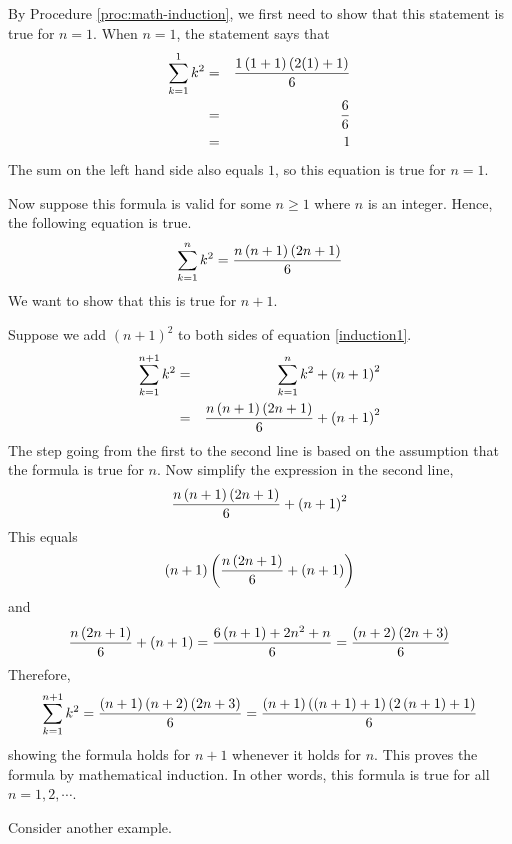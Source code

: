 \begin{solution}
By Procedure \ref{proc:math-induction}, we first need to show that this statement is true for $n=1$.
When $n=1$, the statement says that 
\begin{eqnarray*}
\sum_{k=1}^{1}k^{2}&=&\frac{1\left(1+1\right) \left(2(1)+1\right) }{6}\\
&=&\frac{6}{6} \\
&=& 1
\end{eqnarray*}
The sum on the left hand side also equals $1$, so this equation is true for $n=1$.

Now suppose this formula is valid for some $n\geq
1$ where $n$ is an integer. Hence, the following equation is true.
\begin{equation}
\sum_{k=1}^{n}k^{2}=
\frac{n\left(n+1\right) \left(2n+1\right) }{6}
\label{induction1}
\end{equation}
We want to show that this is true for $n+1$. 

Suppose we add $(n+1)^2$ to both sides of equation \ref{induction1}.
\begin{eqnarray*}
\sum_{k=1}^{n+1}k^{2}&=&\sum_{k=1}^{n}k^{2}+\left(n+1\right) ^{2} \\
&=&\frac{n\left(n+1\right) \left(2n+1\right) }{6}+\left(n+1\right) ^{2}
\end{eqnarray*}
The step going from the first to the second line is based on the assumption
that the formula is true for $n.$
Now simplify the expression in the second line,
\begin{equation*}
\frac{n\left(n+1\right) \left(2n+1\right) }{6}+\left(n+1\right) ^{2}
\end{equation*}
This equals
\begin{equation*}
\left(n+1\right) \left(\frac{n\left(2n+1\right) }{6}+\left(n+1\right)
\right)
\end{equation*}
and
\begin{equation*}
\frac{n\left(2n+1\right) }{6}+\left(n+1\right) =\frac{6\left(n+1\right)
+2n^{2}+n}{6}=\frac{\allowbreak \left(n+2\right) \left(2n+3\right) }{6}
\end{equation*}
Therefore,
\begin{equation*}
\sum_{k=1}^{n+1}k^{2}=\frac{\allowbreak \left(n+1\right) \left(n+2\right)
\left(2n+3\right) }{6}=\frac{\allowbreak \left(n+1\right) \left(\left(
n+1\right) +1\right) \left(2\left(n+1\right) +1\right) }{6}
\end{equation*}
showing the formula holds for $n+1$ whenever it holds for $n.$ This proves
the formula by mathematical induction. In other words, this formula is true for all $n = 1, 2, \cdots$.
\end{solution}

Consider another example.

